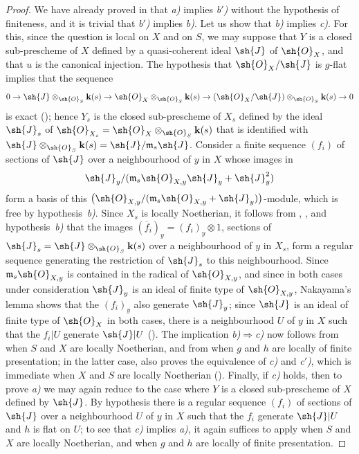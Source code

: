 \begin{proof}
We have already proved in  that \emph{a)} implies \emph{b$'$)} without the hypothesis of finiteness, and it is trivial that \emph{b$'$)} implies \emph{b)}.
Let us show that \emph{b)} implies \emph{c)}.
For this, since the question is local on $X$ and on $S$, we may suppose that $Y$ is a closed sub-prescheme of $X$ defined by a quasi-coherent ideal $\sh{J}$ of $\sh{O}_X$, and that $u$ is the canonical injection.
The hypothesis that $\sh{O}_X/\sh{J}$ is $g$-flat implies that the sequence
\[
  0\to\sh{J}\otimes_{\sh{O}_S}\mathbf{k}(s)\to\sh{O}_X\otimes_{\sh{O}_S}\mathbf{k}(s)\to(\sh{O}_X/\sh{J})\otimes_{\sh{O}_S}\mathbf{k}(s)\to 0
\]
is exact (); hence $Y_s$ is the closed sub-prescheme of $X_s$ defined by the ideal $\sh{J}_s$ of $\sh{O}_{X_s}=\sh{O}_X\otimes_{\sh{O}_S}\mathbf{k}(s)$ that is identified with $\sh{J}\otimes_{\sh{O}_S}\mathbf{k}(s)=\sh{J}/\mathfrak{m}_s\sh{J}$.
Consider a finite sequence $(f_i)$ of sections of $\sh{J}$ over a neighbourhood of $y$ in $X$ whose images in
\[
  \sh{J}_y/(\mathfrak{m}_s\sh{O}_{X,y}\sh{J}_y+\sh{J}_y^2)
\]
form a basis of this $\bigl(\sh{O}_{X,y}/(\mathfrak{m}_s\sh{O}_{X,y}+\sh{J}_y)\bigr)$-module, which is free by hypothesis~\emph{b)}.
Since $X_s$ is locally Noetherian, it follows from ,
, and hypothesis~\emph{b)} that the images $(\overline f_i)_y=(f_i)_y\otimes 1$, sections of $\sh{J}_s=\sh{J}\otimes_{\sh{O}_S}\mathbf{k}(s)$ over a neighbourhood of $y$ in $X_s$, form a regular sequence generating the restriction of $\sh{J}_s$ to this neighbourhood.
Since $\mathfrak{m}_s\sh{O}_{X,y}$ is contained in the radical of $\sh{O}_{X,y}$, and since in both cases under consideration $\sh{J}_y$ is an ideal of finite type of $\sh{O}_{X,y}$, Nakayama's lemma shows that the $(f_i)_y$ also generate $\sh{J}_y$; since $\sh{J}$ is an ideal of finite type of $\sh{O}_X$ in both cases, there is a neighbourhood $U$ of $y$ in $X$ such that the $f_i|U$ generate $\sh{J}|U$ ().
The implication \emph{b)}$\Rightarrow$\emph{c)} now follows from  when $S$ and $X$ are locally Noetherian, and from  when $g$ and $h$ are locally of finite presentation; in the latter case,  also proves the equivalence of \emph{c)} and \emph{c$'$)}, which is immediate when $X$ and $S$ are locally Noetherian ().
Finally, if \emph{c)} holds, then to prove \emph{a)} we may again reduce to the case where $Y$ is a closed sub-prescheme of $X$ defined by $\sh{J}$. By hypothesis there is a regular sequence $(f_i)$ of sections of $\sh{J}$ over a neighbourhood $U$ of $y$ in $X$ such that the $f_i$ generate $\sh{J}|U$ and $h$ is flat on $U$; to see that \emph{c)} implies \emph{a)}, it again suffices to apply  when $S$ and $X$ are locally Noetherian, and  when $g$ and $h$ are locally of finite presentation.
\end{proof}

